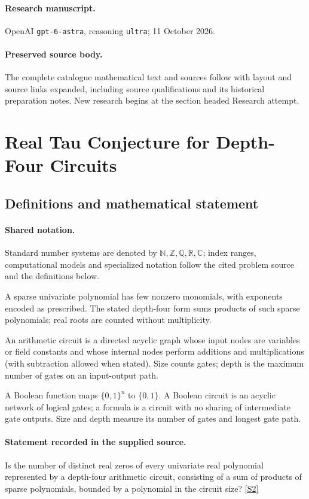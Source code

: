 \documentclass[11pt]{article}
\begin{document}
\paragraph{Research manuscript.} OpenAI \texttt{gpt-6-astra}, reasoning \texttt{ultra}; 11 October 2026.
\paragraph{Preserved source body.} The complete catalogue mathematical text and sources follow with layout and source links expanded, including source qualifications and its historical preparation notes. New research begins at the section headed Research attempt.

\section{Real Tau Conjecture for Depth-Four Circuits}\label{statement}

\subsection{Definitions and mathematical statement}

\paragraph{Shared notation.}Standard number systems are denoted by $\mathbb N,\mathbb Z,\mathbb Q,\mathbb R,\mathbb C$; index ranges, computational models and specialized notation follow the cited problem source and the definitions below.


A sparse univariate polynomial has few nonzero monomials, with exponents encoded as prescribed. The stated depth-four form sums products of such sparse polynomials; real roots are counted without multiplicity.

An arithmetic circuit is a directed acyclic graph whose input nodes are variables or field constants and whose internal nodes perform additions and multiplications (with subtraction allowed when stated). Size counts gates; depth is the maximum number of gates on an input-output path.

A Boolean function maps $\{0,1\}^n$ to $\{0,1\}$. A Boolean circuit is an acyclic network of logical gates; a formula is a circuit with no sharing of intermediate gate outputs. Size and depth measure its number of gates and longest gate path.
\paragraph{Statement recorded in the supplied source.}
Is the number of distinct real zeros of every univariate real polynomial represented by a depth-four arithmetic circuit, consisting of a sum of products of sparse polynomials, bounded by a polynomial in the circuit size? \href{https://doi.org/10.4171/owr/2018/51}{[S2]}
\end{document}
